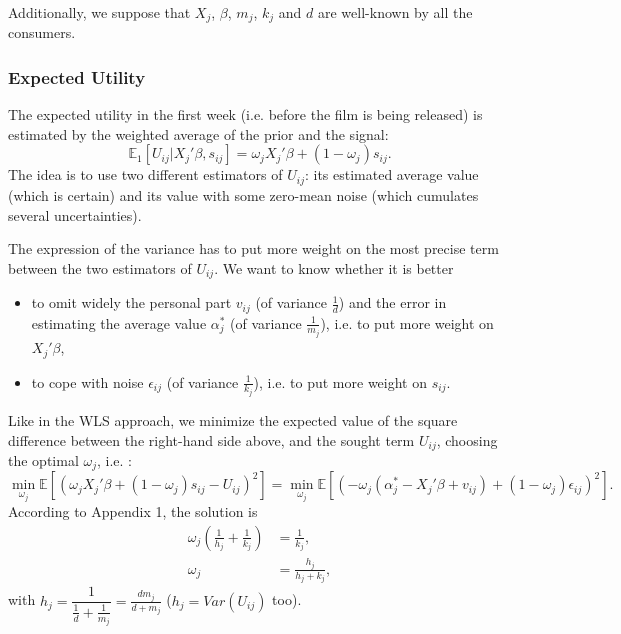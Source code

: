	Additionally, we suppose that $X_{j}$, $\beta$, $m_{j}$, $k_{j}$ and $d$ are well-known by all the consumers.

	\subsubsection{Expected Utility}

			The expected utility in the first week (i.e. before the film is being released) is estimated by the weighted average of the prior and the signal:
	\begin{equation*}
		\mathbb{E}_1[U_{i j}|X_{j}'\beta, s_{i j}]=\omega_{j} X_{j}'\beta+(1-\omega_{j})s_{i j}.
	\end{equation*}
	The idea is to use two different estimators of $U_{i j}$: its estimated average value (which is certain) and its value with some zero-mean noise (which cumulates several uncertainties).

	The expression of the variance has to put more weight on the most precise term between the two estimators of $U_{i j}$. 
	We want to know whether it is better 
	\begin{itemize}
		\item to omit widely the personal part $v_{i j}$ (of variance $\frac{1}{d}$) and the error in estimating the average value $\alpha_{j}^{*}$ (of variance $\frac{1}{m_{j}}$), i.e. to put more weight on $X_{j}'\beta$,
		\item to cope with noise $\epsilon_{i j}$ (of variance $\frac{1}{k_{j}}$), i.e. to put more weight on $s_{i j}$.\\
	\end{itemize}

	Like in the WLS approach, we minimize the expected value of the square difference between the right-hand side above, and the sought term $U_{i j}$, choosing the optimal $\omega_{j}$, i.e. :
	\begin{equation}
		\min_{\omega_{j}} \mathbb{E}[(\omega_{j} X_{j}'\beta+(1-\omega_{j})s_{i j}-U_{i j})^{2}]=\min_{\omega_{j}} \mathbb{E}[(-\omega_{j} (\alpha_{j}^{*}-X_{j}'\beta+v_{i j})+(1-\omega_{j})\epsilon_{i j})^{2}].
	\end{equation}
	According to Appendix 1, the solution is
	\begin{align*}
		\omega_{j}(\frac{1}{h_{j}}+\frac{1}{k_{j}})&=\frac{1}{k_{j}},\\
		\omega_j&=\frac{h_{j}}{h_{j}+k_{j}},
	\end{align*}
	with $h_{j}=\dfrac{1}{\frac{1}{d}+\frac{1}{m_{j}}}=\frac{d m_{j}}{d+m_{j}}$ ($h_{j}=Var(U_{i j})$ too).


